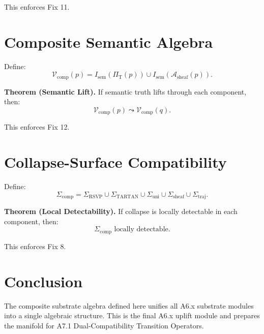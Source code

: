 \documentclass[11pt]{article}
\begin{document}
This enforces Fix 11.

\section{Composite Semantic Algebra}

Define:
\[
\mathcal{V}_{\mathrm{comp}}(p) =
I_{\mathrm{sem}}(\Pi_{\mathrm{T}}(p))
\cup
I_{\mathrm{sem}}(\mathcal{A}_{\mathrm{sheaf}}(p)).
\]

\textbf{Theorem (Semantic Lift).}
If semantic truth lifts through each component, then:
\[
\mathcal{V}_{\mathrm{comp}}(p) \leadsto \mathcal{V}_{\mathrm{comp}}(q).
\]

This enforces Fix 12.

\section{Collapse-Surface Compatibility}

Define:
\[
\Sigma_{\mathrm{comp}} =
\Sigma_{\mathrm{RSVP}}
\cup
\Sigma_{\mathrm{TARTAN}}
\cup
\Sigma_{\mathrm{uni}}
\cup
\Sigma_{\mathrm{sheaf}}
\cup
\Sigma_{\mathrm{traj}}.
\]

\textbf{Theorem (Local Detectability).}
If collapse is locally detectable in each component, then:
\[
\Sigma_{\mathrm{comp}} \text{ locally detectable}.
\]

This enforces Fix 8.

\section{Conclusion}

The composite substrate algebra defined here unifies all A6.x substrate modules
into a single algebraic structure. This is the final A6.x uplift module and
prepares the manifold for A7.1 Dual-Compatibility Transition Operators.
\end{document}

